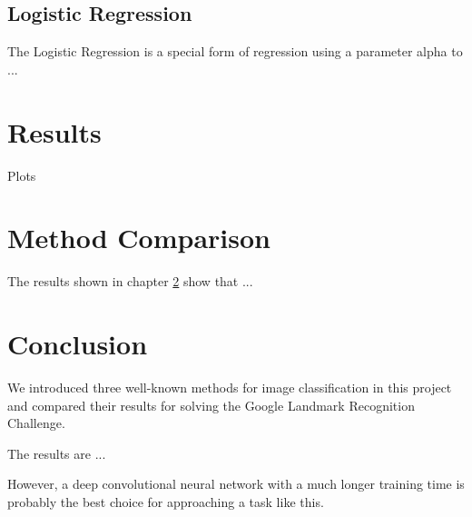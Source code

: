 \section{Logistic Regression}

The Logistic Regression is a special form of regression using a parameter alpha to ...

\chapter{Results}\label{results}

Plots

\chapter{Method Comparison}

The results shown in chapter \ref{results} show that ...

\chapter{Conclusion}

We introduced three well-known methods for image classification in this project and compared their results for solving the Google Landmark Recognition Challenge.

The results are ...

However, a deep convolutional neural network with a much longer training time is probably the best choice for approaching a task like this.